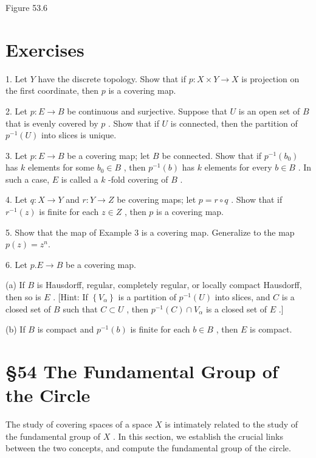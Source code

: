 Figure 53.6

\section*{Exercises}

1. Let \(Y\) have the discrete topology. Show that if \(p : X \times  Y \rightarrow  X\) is projection on the first coordinate, then \(p\) is a covering map.

2. Let \(p : E \rightarrow  B\) be continuous and surjective. Suppose that \(U\) is an open set of \(B\) that is evenly covered by \(p\) . Show that if \(U\) is connected, then the partition of \({p}^{-1}\left( U\right)\) into slices is unique.

3. Let \(p : E \rightarrow  B\) be a covering map; let \(B\) be connected. Show that if \({p}^{-1}\left( {b}_{0}\right)\) has \(k\) elements for some \({b}_{0} \in  B\) , then \({p}^{-1}\left( b\right)\) has \(k\) elements for every \(b \in  B\) . In such a case, \(E\) is called a \(k\) -fold covering of \(B\) .

4. Let \(q : X \rightarrow  Y\) and \(r : Y \rightarrow  Z\) be covering maps; let \(p = r \circ  q\) . Show that if \({r}^{-1}\left( z\right)\) is finite for each \(z \in  Z\) , then \(p\) is a covering map.

5. Show that the map of Example 3 is a covering map. Generalize to the map \(p\left( z\right)  = {z}^{n}.\)

6. Let \(p.E \rightarrow  B\) be a covering map.

(a) If \(B\) is Hausdorff, regular, completely regular, or locally compact Hausdorff, then so is \(E\) . [Hint: If \(\left\{  {V}_{\alpha }\right\}\) is a partition of \({p}^{-1}\left( U\right)\) into slices, and \(C\) is a closed set of \(B\) such that \(C \subset  U\) , then \({p}^{-1}\left( C\right)  \cap  {V}_{\alpha }\) is a closed set of \(E\) .]

(b) If \(B\) is compact and \({p}^{-1}\left( b\right)\) is finite for each \(b \in  B\) , then \(E\) is compact.

\section*{§54 The Fundamental Group of the Circle}

The study of covering spaces of a space \(X\) is intimately related to the study of the fundamental group of \(X\) . In this section, we establish the crucial links between the two concepts, and compute the fundamental group of the circle.


